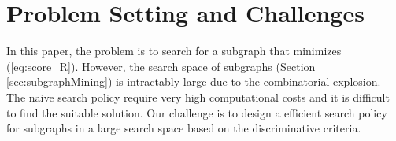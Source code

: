 \section{Problem Setting and Challenges}
In this paper, the problem is to search for a subgraph 
that minimizes (\ref{eq:score_R}).
However, the search space of subgraphs (Section \ref{sec:subgraphMining}) is intractably large
due to the combinatorial explosion.
The naive search policy require very high computational costs 
and it is difficult to find the suitable solution.
Our challenge is to design a efficient search policy for subgraphs in a large search space
based on the discriminative criteria.

